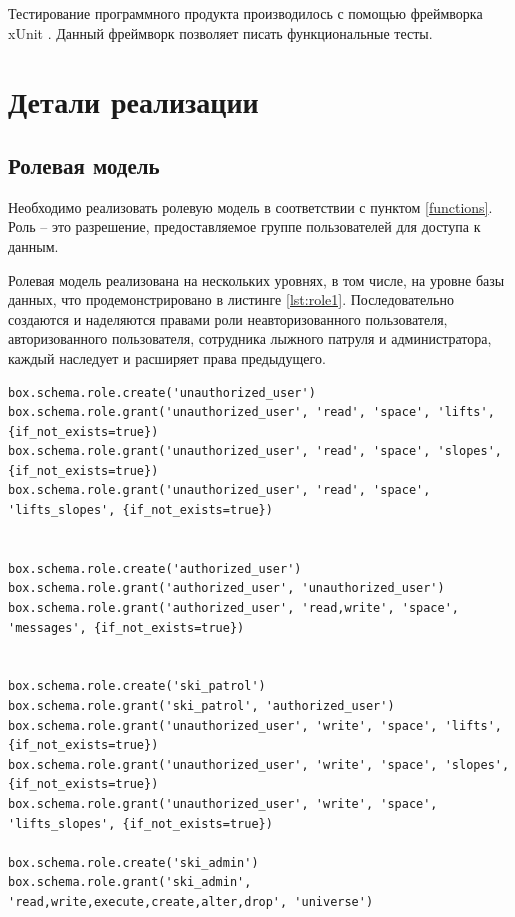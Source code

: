 Тестирование программного продукта производилось с помощью фреймворка xUnit \cite{test}. Данный фреймворк позволяет писать функциональные тесты. 

\section{Детали реализации}

\subsection{Ролевая модель}

Необходимо реализовать ролевую модель в соответствии с пунктом \ref{functions}. Роль – это разрешение, предоставляемое группе пользователей для доступа к данным. 

Ролевая модель реализована на нескольких уровнях, в том числе, на уровне базы данных, что продемонстрировано в листинге \ref{lst:role1}. Последовательно создаются и наделяются правами роли неавторизованного пользователя, авторизованного пользователя, сотрудника лыжного патруля и администратора, каждый наследует и расширяет права предыдущего.

\captionsetup{justification=centering,singlelinecheck=off}
\begin{lstlisting}[label=lst:role1, caption=Ролевая модель на уровне БД, style=myLuastyle]
box.schema.role.create('unauthorized_user')
box.schema.role.grant('unauthorized_user', 'read', 'space', 'lifts', {if_not_exists=true})
box.schema.role.grant('unauthorized_user', 'read', 'space', 'slopes', {if_not_exists=true})
box.schema.role.grant('unauthorized_user', 'read', 'space', 'lifts_slopes', {if_not_exists=true})


box.schema.role.create('authorized_user')
box.schema.role.grant('authorized_user', 'unauthorized_user')
box.schema.role.grant('authorized_user', 'read,write', 'space', 'messages', {if_not_exists=true})


box.schema.role.create('ski_patrol')
box.schema.role.grant('ski_patrol', 'authorized_user')
box.schema.role.grant('unauthorized_user', 'write', 'space', 'lifts', {if_not_exists=true})
box.schema.role.grant('unauthorized_user', 'write', 'space', 'slopes', {if_not_exists=true})
box.schema.role.grant('unauthorized_user', 'write', 'space', 'lifts_slopes', {if_not_exists=true})

box.schema.role.create('ski_admin')
box.schema.role.grant('ski_admin', 'read,write,execute,create,alter,drop', 'universe')
\end{lstlisting}

